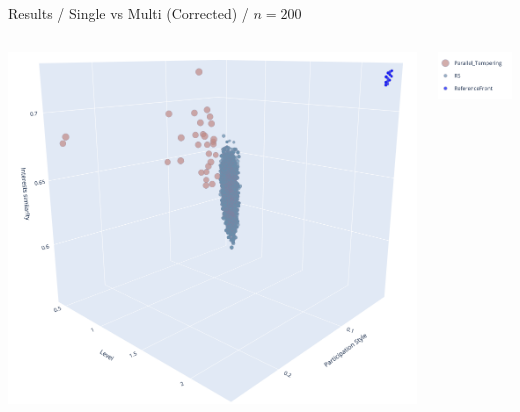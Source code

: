 \documentclass{beamer}
\begin{document}
    \begin{frame}{Results / Single vs Multi (Corrected) / $n=200$}
            \begin{columns}
                \begin{column}{0.70\textwidth}
                    \includegraphics[width=\textwidth]{images/200_both_rev.png}
                \end{column}
                \begin{column}{0.30\textwidth}
                    \includegraphics[width=\textwidth]{images/legend_both_rev.png}
                \end{column}
            \end{columns}\\
    \end{frame}
    
\end{document}
